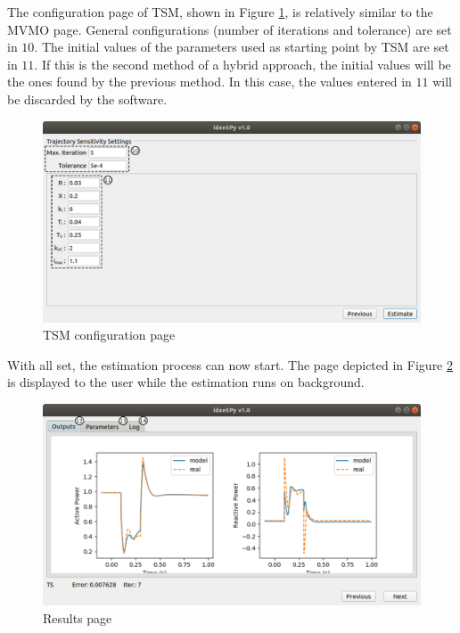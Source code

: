 The configuration page of TSM, shown in Figure \ref{fig: TS_page}, is relatively similar to the MVMO page. General configurations (number of iterations and tolerance) are set in $10$. The initial values of the parameters used as starting point by TSM are set in $11$. If this is the second method of a hybrid approach, the initial values will be the ones found by the previous method. In this case, the values entered in $11$ will be discarded by the software.

\begin{figure}[!h]
	\caption{TSM configuration page}
	\begin{center}
		\includegraphics[scale=.5]{Images/Software_TS_page.eps}
	\end{center}
	\label{fig: TS_page}
\end{figure}

With all set, the estimation process can now start. The page depicted in Figure \ref{fig: final_pg} is displayed to the user while the estimation runs on background.

\begin{figure}[h]
	\caption{Results page}
	\begin{center}
		\includegraphics[scale=.5]{Images/Software_results_page.eps}
	\end{center}
	\label{fig: final_pg}
\end{figure}

